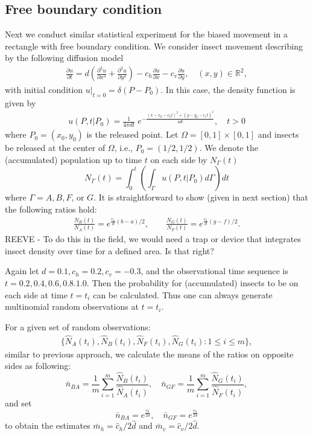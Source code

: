 \documentclass[11pt]{article}
\newcommand{\bean}{\begin{eqnarray*}}
\newcommand{\eean}{\end{eqnarray*}}
\newcommand{\Real}{\mathbb R}
\begin{document}
\subsection{Free boundary condition}
Next we conduct similar statistical experiment for the biased movement in a rectangle with free boundary condition. We consider insect movement describing by the following diffusion model 
\bean
\frac{\partial u}{\partial t}=d\left(\frac{\partial^2u}{\partial x^2}+\frac{\partial^2u}{\partial y^2}\right)-c_h\frac{\partial u}{\partial x}-c_v\frac{\partial u}{\partial y}, \quad (x, y)\in \Real^2,
\eean
with initial condition $u|_{t=0}=\delta(P-P_0)$. In this case, the density function is given by
\bean
u(P, t|P_0)=\frac{1}{4\pi d t}\;e^{-\frac{(x-x_0-c_ht)^2+(y-y_0-c_vt)^2}{4dt}},\quad t>0
\eean
where $P_0=(x_0, y_0)$ is the released point. 
Let $\Omega=[0, 1]\times [0, 1]$ and insects be released at the center of $\Omega$, i.e., $P_0=(1/2, 1/2)$. We denote the (accumulated) population  up to time $t$ on each side by ${N}_\Gamma(t)$
\[N_\Gamma(t)=\int_0^t\left(\int_\Gamma u(P, t|P_0) d\Gamma\right) dt\]
 where $\Gamma=A, B, F$, or $G$. It is straightforward to show (given in next section) that the following ratios hold:
\bean
\frac{N_B(t)}{N_A(t)}=e^{\frac{c_h}{d}(b-a)/2}, \qquad \frac{{N}_G(t)}{{N}_F(t)}=e^{\frac{c_h}{d}(g-f)/2}.
\eean
REEVE - To do this in the field, we would need a trap or device that integrates insect density over time for a defined area.  Is that right?  

Again let $d=0.1, c_h=0.2, c_v=-0.3$, and the observational time sequence is $t=0.2, 0.4, 0.6, 0.8. 1.0$. Then the probability for (accumulated) insects to be on each side at time $t=t_i$ can be calculated. 
Thus one can always generate multinomial random observations at $t=t_i$. 

For a given set of random observations:
\bean
\{\hat{{ N}}_A(t_i), \hat{{ N}}_B(t_i), \hat{{N}}_F(t_i), \hat{{ N}}_G(t_i): 1\le i\le m\},
\eean
similar to previous approach, we calculate the means of the ratios on opposite sides as following:
\[{\bar n}_{BA}=\frac{1}{m}\sum_{i=1}^m \frac{\hat{{ N}}_B(t_i)}{\hat{{ N}}_A(t_i)}, \quad {\bar n}_{GF}=\frac{1}{m}\sum_{i=1}^m \frac{\hat{{ N}}_G(t_i)}{\hat{{ N}}_F(t_i)},\]
and set
\[{\bar n}_{BA}=e^{\frac{c_h}{2d}}, \quad {\bar n}_{GF}=e^{\frac{c_h}{2d}}\]
to obtain the estimates $\bar{m}_h={\hat{c}_h}/{2\hat{d}}$ and $\bar{m}_v={\hat{c}_v}/2{\hat{d}}$. 
\end{document}
